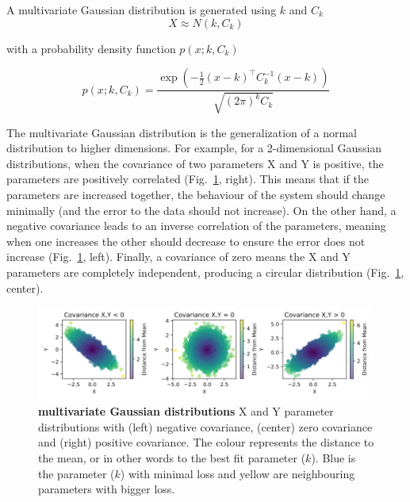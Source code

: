 A multivariate Gaussian distribution is generated using $k$ and $C_{k}$
\begin{equation}
    X \approx N(k,C_k)
\end{equation}

with a probability density function $p(x;k,C_k )$

\begin{equation}
    p(x;k,C_k )= \frac{\exp\left(-\frac{1}{2} (x - k)^\top C_k^{-1} (x - k)\right)}{\sqrt{(2\pi)^k C_k}}
\end{equation}

The multivariate Gaussian distribution is the generalization of a normal distribution to higher dimensions.
For example, for a 2-dimensional Gaussian distributions,
when the covariance of two parameters X and Y is positive, the parameters are positively correlated
(Fig.~\ref{fig:multivariate_gaussians}, right).
This means that if the parameters are increased together, the behaviour of the system should change minimally
(and the error to the data should not increase).
On the other hand, a negative covariance leads to an inverse correlation of the parameters,
meaning when one increases the other should decrease to ensure the error does not increase
(Fig.~\ref{fig:multivariate_gaussians}, left).
Finally, a covariance of zero means the X and Y parameters are completely independent,
producing a circular distribution (Fig.~\ref{fig:multivariate_gaussians}, center).

\begin{figure}[H] %
    \centering
    \begin{adjustbox}{center}
        \includegraphics[width=1\textwidth]{chapters/Chapter 2/multivariate_gaussians} %
    \end{adjustbox}
    \caption{\textbf{multivariate Gaussian distributions} X and Y parameter distributions with (left) negative covariance, (center) zero covariance and (right) positive covariance.
    The colour represents the distance to the mean, or in other words to the best fit parameter ($k$).
    Blue is the parameter ($k$) with minimal loss and yellow are neighbouring parameters with bigger loss.}
    \label{fig:multivariate_gaussians} %
\end{figure}


